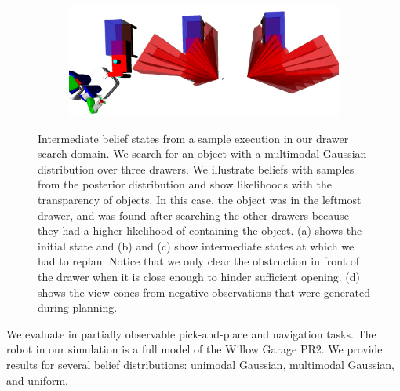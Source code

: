 \begin{figure}
\begin{subfigure}[b]{0.48\linewidth}
    \caption{}
    \label{fig:step4}
  \end{subfigure}
  \begin{subfigure}[b]{0.48\linewidth}
    \includegraphics[width=\textwidth]{drawer_images/drawer_dist_negreg.png}
    \caption{}
    \label{fig:step5}
  \end{subfigure}
  \caption{Intermediate belief states from a sample execution in our
    drawer search domain. We search for an object with a multimodal
    Gaussian distribution over three drawers. We illustrate beliefs with
    samples from the posterior distribution and show likelihoods with
    the transparency of objects. In this case, the object was in the
    leftmost drawer, and was found after searching the other
    drawers because they had a higher likelihood of containing the object. (a) shows the initial state and (b) and (c) show
    intermediate states at which we had to replan. Notice that we only clear
    the obstruction in front of the drawer when it is close enough to hinder sufficient opening.
    (d) shows the view cones from negative observations that were generated during planning.}
  \label{fig:drawerimgs}
\end{figure}


We evaluate \ibsp{} in partially observable pick-and-place and navigation tasks.
The robot in our simulation is a full model of the Willow Garage PR2. We
provide results for several belief distributions: unimodal Gaussian, multimodal
Gaussian, and uniform.
